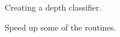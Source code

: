 
\begin{DoxyRefList}
\item[\label{todo__todo000001}%
\hypertarget{todo__todo000001}{}%
page \hyperlink{index}{Project\-: Social Robot Using N\-A\-O and Kinect} ]Creating a depth classifier. 

Speed up some of the routines.
\end{DoxyRefList}